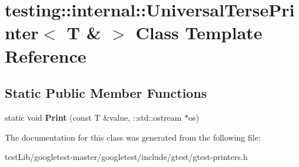 \hypertarget{classtesting_1_1internal_1_1UniversalTersePrinter_3_01T_01_6_01_4}{}\section{testing\+:\+:internal\+:\+:Universal\+Terse\+Printer$<$ T \& $>$ Class Template Reference}
\label{classtesting_1_1internal_1_1UniversalTersePrinter_3_01T_01_6_01_4}
\subsection*{Static Public Member Functions}
\begin{DoxyCompactItemize}
\item 
\mbox{\label{classtesting_1_1internal_1_1UniversalTersePrinter_3_01T_01_6_01_4_a931f93cc52a3046706c87d0a90640483}} 
static void {\bfseries Print} (const T \&value, \+::std\+::ostream $\ast$os)
\end{DoxyCompactItemize}


The documentation for this class was generated from the following file\+:\begin{DoxyCompactItemize}
\item 
test\+Lib/googletest-\/master/googletest/include/gtest/gtest-\/printers.\+h\end{DoxyCompactItemize}
